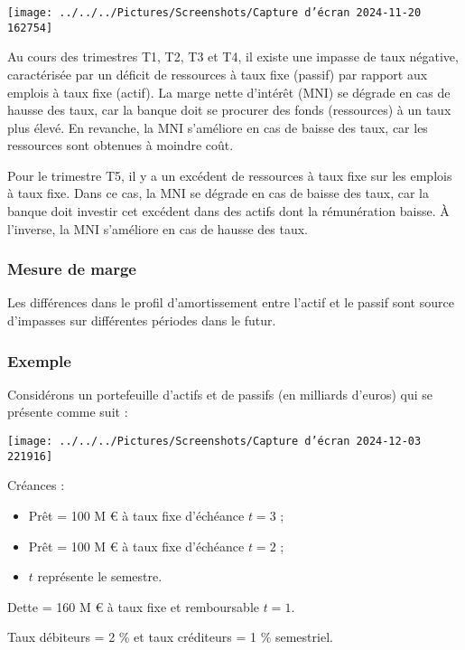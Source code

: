 \documentclass[a4paper, 12pt]{report}
\begin{document}
\begin{center}
	\texttt{[image: ../../../Pictures/Screenshots/Capture d'écran 2024-11-20 162754]}
\end{center}

Au cours des trimestres T1, T2, T3 et T4, il existe une impasse de taux négative, caractérisée par un déficit de ressources à taux fixe (passif) par rapport aux emplois à taux fixe (actif). La marge nette d'intérêt (MNI) se dégrade en cas de hausse des taux, car la banque doit se procurer des fonds (ressources) à un taux plus élevé. En revanche, la MNI s’améliore en cas de baisse des taux, car les ressources sont obtenues à moindre coût.

Pour le trimestre T5, il y a un excédent de ressources à taux fixe sur les emplois à taux fixe. Dans ce cas, la MNI se dégrade en cas de baisse des taux, car la banque doit investir cet excédent dans des actifs dont la rémunération baisse. À l'inverse, la MNI s’améliore en cas de hausse des taux.

\subsubsection{Mesure de marge}

Les différences dans le profil d’amortissement entre l’actif et le passif sont source d’impasses sur différentes périodes dans le futur.

\subsubsection{Exemple}

Considérons un portefeuille d'actifs et de passifs (en milliards d’euros) qui se présente comme suit :
\begin{center}
	\texttt{[image: ../../../Pictures/Screenshots/Capture d'écran 2024-12-03 221916]}
\end{center}

Créances :
\begin{itemize}
	\item Prêt = 100 M € à taux fixe d’échéance \(t = 3\) ;
	\item Prêt = 100 M € à taux fixe d’échéance \(t = 2\) ;
	\item \(t\) représente le semestre.
\end{itemize}

Dette = 160 M € à taux fixe et remboursable \(t = 1\).

Taux débiteurs = 2 \% et taux créditeurs = 1 \% semestriel.
\end{document}
